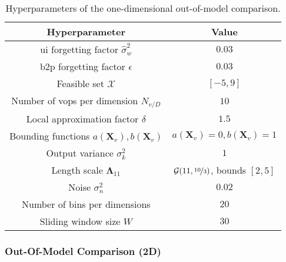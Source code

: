 \bgroup
\def\arraystretch{1}
\begin{table}[h]
    \small
    \centering
    \begin{tabular}{c||c}
        \textbf{Hyperparameter} & \textbf{Value} \\\hline\hline
        \gls{ui} forgetting factor $\hat{\sigma}_w^2$ & $0.03$\\
        \gls{b2p} forgetting factor $\epsilon$ & $0.03$\\
        Feasible set $\mathcal{X}$ & $[-5,9]$\\
        Number of \glspl{vop} per dimension $N_{v/D}$ & $10$\\
        Local approximation factor $\delta$ & $1.5$\\
        Bounding functions $a(\mathbf{X}_v),b(\mathbf{X}_v)$ & $a(\mathbf{X}_v)=0,b(\mathbf{X}_v)=1$\\
        Output variance $\sigma_k^2$ & $1$\\
        Length scale $\boldsymbol\Lambda_{11}$ & $\mathcal{G}(11, \nicefrac{10}{3})$, bounds $[2, 5]$\\
        Noise $\sigma_n^2$ & $0.02$ \\
        Number of bins per dimensions & $20$\\
        Sliding window size $W$ & $30$
    \end{tabular}
    \caption{Hyperparameters of the one-dimensional out-of-model comparison.}
    \label{tab:params_OOMC_1D}
\end{table}
\egroup

\subsubsection{Out-Of-Model Comparison (2D)}

